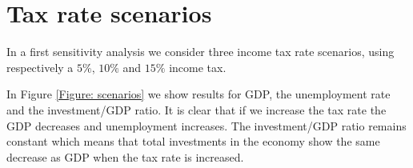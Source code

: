 \section{Tax rate scenarios}
In a first sensitivity analysis we consider three income tax rate scenarios, using respectively a $5\%$, $10\%$ and $15\%$ income tax.

In Figure \ref{Figure: scenarios} we show results for GDP, the unemployment rate and the investment/GDP ratio.
It is clear that if we increase the tax rate the GDP decreases and unemployment increases.
The investment/GDP ratio remains constant which means that total investments in the economy show the same decrease as GDP when the tax rate is increased.





